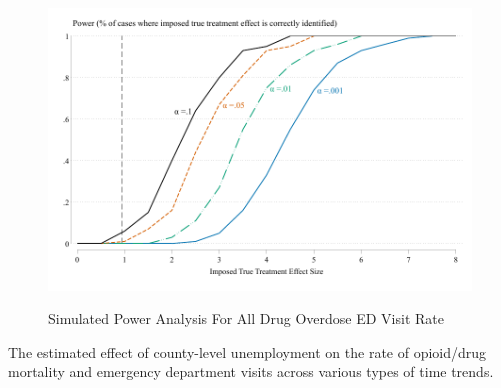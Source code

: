 \documentclass[12pt]{article}
\begin{document}
	
\begin{figure}[h]
	\caption[Power Analysis for All Drug ED Visits]{Simulated Power Analysis For All Drug Overdose ED Visit Rate}
	\includegraphics[width=\linewidth]{../results/appendix/figures/power_analysis_results.pdf}
	\label{fig:power_analysis}
\end{figure}



 		\begin{table}[ht]\centering
			\begin{adjustbox}{width=\textwidth}
			\centering
			  \begin{threeparttable}
			    \caption[Various types of time trends]{The estimated effect of county-level unemployment on the rate of opioid/drug mortality and emergency department visits across various types of time trends.}
			    \label{tab:different_time_trends}
			  \end{threeparttable}
			 \end{adjustbox}
		\end{table}
\end{document}
